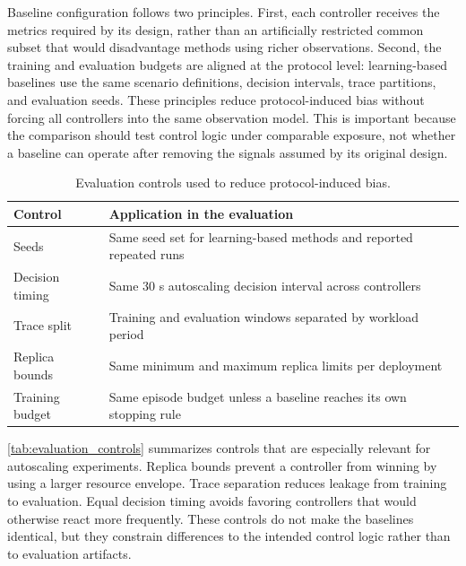 \documentclass[journal]{IEEEtran}
\begin{document}
Baseline configuration follows two principles. First, each controller receives the metrics required by its design, rather than an artificially restricted common subset that would disadvantage methods using richer observations. Second, the training and evaluation budgets are aligned at the protocol level: learning-based baselines use the same scenario definitions, decision intervals, trace partitions, and evaluation seeds. These principles reduce protocol-induced bias without forcing all controllers into the same observation model. This is important because the comparison should test control logic under comparable exposure, not whether a baseline can operate after removing the signals assumed by its original design.

\begin{table}[t]
  \centering
  \caption{Evaluation controls used to reduce protocol-induced bias.}
  \label{tab:evaluation_controls}
  \scriptsize
  \setlength{\tabcolsep}{3pt}
  \renewcommand{\arraystretch}{1.05}
  \begin{tabularx}{\columnwidth}{lX}
    \toprule
    \textbf{Control} & \textbf{Application in the evaluation}                              \\
    \midrule
    Seeds            & Same seed set for learning-based methods and reported repeated runs \\
    Decision timing  & Same 30 s autoscaling decision interval across controllers          \\
    Trace split      & Training and evaluation windows separated by workload period        \\
    Replica bounds   & Same minimum and maximum replica limits per deployment              \\
    Training budget  & Same episode budget unless a baseline reaches its own stopping rule \\
    \bottomrule
  \end{tabularx}
\end{table}

\autoref{tab:evaluation_controls} summarizes controls that are especially relevant for autoscaling experiments. Replica bounds prevent a controller from winning by using a larger resource envelope. Trace separation reduces leakage from training to evaluation. Equal decision timing avoids favoring controllers that would otherwise react more frequently. These controls do not make the baselines identical, but they constrain differences to the intended control logic rather than to evaluation artifacts.
\end{document}
